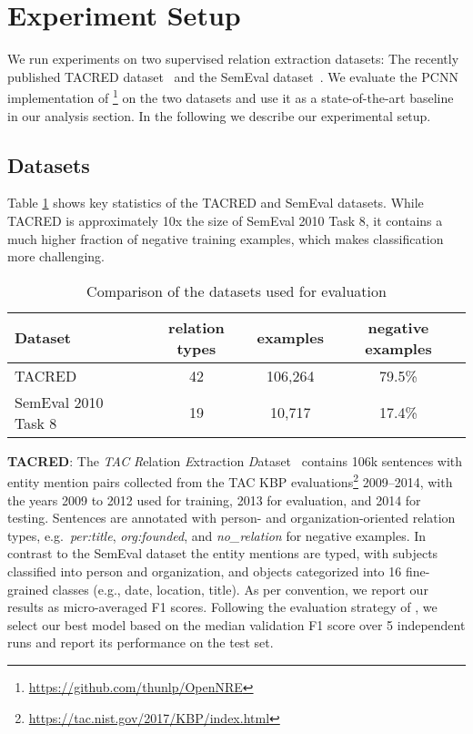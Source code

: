 \documentclass[akbc,twoside,11pt]{article}
\begin{document}
\section{Experiment Setup}
\label{experiment_setup}
We run experiments on two supervised relation extraction datasets: The recently published TACRED dataset~\cite{zhang_position_aware_2017} and the SemEval dataset~\cite{hendrickx_semeval2010t8_2010}. We evaluate the PCNN implementation of \citet{zeng_distant_2015}\footnote{\url{https://github.com/thunlp/OpenNRE}} on the two datasets and use it as a state-of-the-art baseline in our analysis section. In the following we describe our experimental setup. 


\subsection{Datasets}
\label{subsec:exp_datasets}

Table \ref{tab:dataset_stats} shows key statistics of the TACRED and SemEval datasets. While TACRED is approximately 10x the size of SemEval 2010 Task 8, it contains a much higher fraction of negative training examples, which makes classification more challenging.
\begin{table}[ht!]
    \centering
    \begin{tabular}{l c c c}
        \hline
        Dataset & relation types & examples & negative examples \\
        \hline
        TACRED & 42 & 106,264 & 79.5\% \\
        SemEval 2010 Task 8 & 19 & 10,717 & 17.4\% \\
        \hline
    \end{tabular}
    \caption{Comparison of the datasets used for evaluation}
    \label{tab:dataset_stats}
\end{table}

\noindent \textbf{TACRED}: The \textit{TAC} \textit{R}elation \textit{E}xtraction \textit{D}ataset~\cite{zhang_position_aware_2017} contains 106k sentences with entity mention pairs collected from the TAC KBP evaluations\footnote{\url{https://tac.nist.gov/2017/KBP/index.html}} 2009--2014, with the years 2009 to 2012 used for training, 2013 for evaluation, and 2014 for testing. Sentences are annotated with person- and organization-oriented relation types, e.g.\ \emph{per:title}, \emph{org:founded}, and \emph{no\_relation} for negative examples. In contrast to the SemEval dataset the entity mentions are typed, with subjects classified into person and organization, and objects categorized into 16 fine-grained classes (e.g., date, location, title). As per convention, we report our results as micro-averaged F1 scores. Following the evaluation strategy of \citet{zhang_position_aware_2017}, we select our best model based on the median validation F1 score over 5 independent runs and report its performance on the test set.
\end{document}
